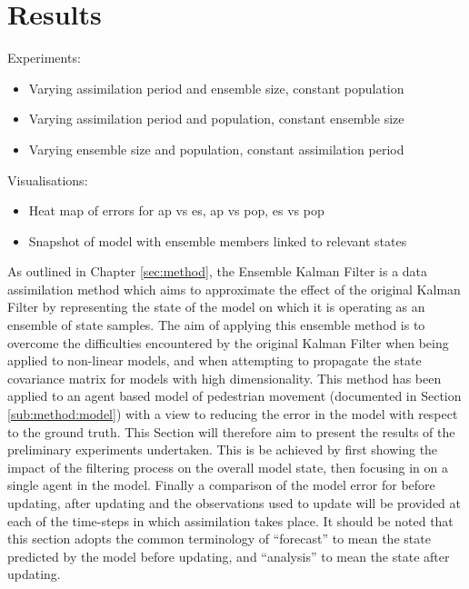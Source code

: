 \section{Results}\label{sec:results}

Experiments:
\begin{itemize}
    \item Varying assimilation period and ensemble size, constant population
    \item Varying assimilation period and population, constant ensemble size
    \item Varying ensemble size and population, constant assimilation period
\end{itemize}

Visualisations:
\begin{itemize}
    \item Heat map of errors for ap vs es, ap vs pop, es vs pop
    \item Snapshot of model with ensemble members linked to relevant states
\end{itemize}

As outlined in Chapter \ref{sec:method}, the Ensemble Kalman Filter is a data
assimilation method which aims to approximate the effect of the original Kalman
Filter by representing the state of the model on which it is operating as an
ensemble of state samples.
The aim of applying this ensemble method is to overcome the difficulties
encountered by the original Kalman Filter when being applied to non-linear
models, and when attempting to propagate the state covariance matrix for models
with high dimensionality.
This method has been applied to an agent based model of pedestrian movement
(documented in Section \ref{sub:method:model}) with a view to reducing the error
in the model with respect to the ground truth.
This Section will therefore aim to present the results of the preliminary
experiments undertaken.
This is be achieved by first showing the impact of the filtering process on the
overall model state, then focusing in on a single agent in the model.
Finally a comparison of the model error for before updating, after updating and
the observations used to update will be provided at each of the time-steps in
which assimilation takes place.
It should be noted that this section adopts the common terminology of
``forecast'' to mean the state predicted by the model before updating, and
``analysis'' to mean the state after updating.

